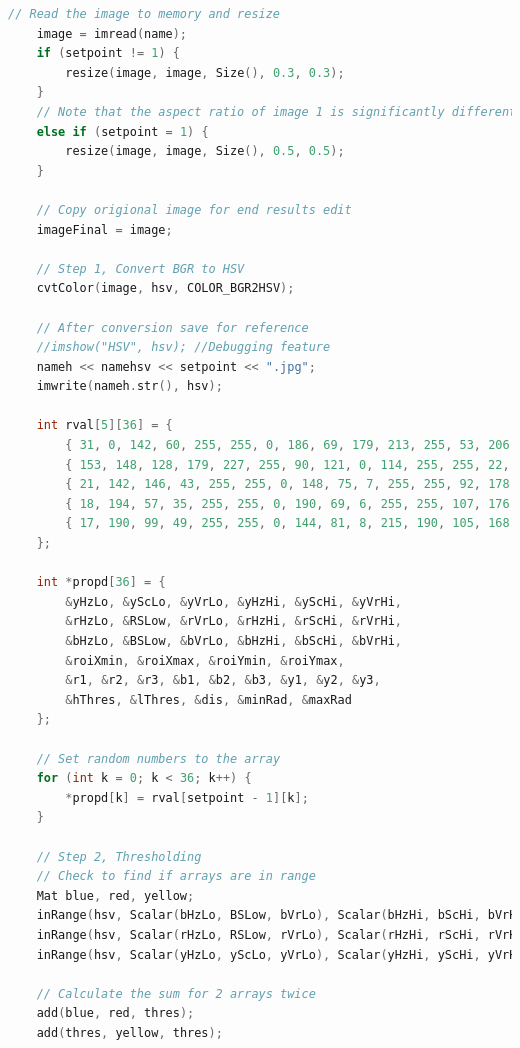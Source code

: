 \documentclass[a4paper, 10pt]{IEEEconf}
\begin{document}
\begin{lstlisting}[language = c++]
	// Read the image to memory and resize
	image = imread(name);
	if (setpoint != 1) {
		resize(image, image, Size(), 0.3, 0.3);
	}
	// Note that the aspect ratio of image 1 is significantly different than the others, these values provide better results
	else if (setpoint = 1) {
		resize(image, image, Size(), 0.5, 0.5);
	}

	// Copy origional image for end results edit
	imageFinal = image;

	// Step 1, Convert BGR to HSV
	cvtColor(image, hsv, COLOR_BGR2HSV);

	// After conversion save for reference
	//imshow("HSV", hsv); //Debugging feature
	nameh << namehsv << setpoint << ".jpg";
	imwrite(nameh.str(), hsv);

	int rval[5][36] = {
		{ 31, 0, 142, 60, 255, 255, 0, 186, 69, 179, 213, 255, 53, 206, 51, 179, 255, 255, 300, 700, 50, 470, 100, 100, 100, 90, 50, 30, 100, 100, 100, 150, 50, 30, 10, 40 },
		{ 153, 148, 128, 179, 227, 255, 90, 121, 0, 114, 255, 255, 22, 63, 148, 89, 198, 255, 260, 700, 170, 470, 110, 100, 100, 100, 130, 50, 140, 180, 110, 150, 50, 30, 10, 40 },
		{ 21, 142, 146, 43, 255, 255, 0, 148, 75, 7, 255, 255, 92, 178, 8, 150, 255, 225, 260, 700, 50, 470, 50, 40, 70, 20, 30,20, 10, 160, 160, 126, 42, 30, 5, 40 },
		{ 18, 194, 57, 35, 255, 255, 0, 190, 69, 6, 255, 255, 107, 176, 45, 112, 255, 255, 260, 700, 50, 470, 60, 65, 67, 34, 85, 88, 100, 100, 100, 82, 34, 30, 10, 40 },
		{ 17, 190, 99, 49, 255, 255, 0, 144, 81, 8, 215, 190, 105, 168, 24, 157, 255, 204, 260, 600, 170, 470, 100, 100, 100, 66, 70, 61, 100, 100, 100, 100, 33, 30, 10, 40 }
	};

	int *propd[36] = {
		&yHzLo, &yScLo, &yVrLo, &yHzHi, &yScHi, &yVrHi,
		&rHzLo, &RSLow, &rVrLo, &rHzHi, &rScHi, &rVrHi,
		&bHzLo, &BSLow, &bVrLo, &bHzHi, &bScHi, &bVrHi,
		&roiXmin, &roiXmax, &roiYmin, &roiYmax,
		&r1, &r2, &r3, &b1, &b2, &b3, &y1, &y2, &y3,
		&hThres, &lThres, &dis, &minRad, &maxRad
	};

	// Set random numbers to the array
	for (int k = 0; k < 36; k++) {
		*propd[k] = rval[setpoint - 1][k];
	}

	// Step 2, Thresholding 
	// Check to find if arrays are in range
	Mat blue, red, yellow;
	inRange(hsv, Scalar(bHzLo, BSLow, bVrLo), Scalar(bHzHi, bScHi, bVrHi), blue);
	inRange(hsv, Scalar(rHzLo, RSLow, rVrLo), Scalar(rHzHi, rScHi, rVrHi), red);
	inRange(hsv, Scalar(yHzLo, yScLo, yVrLo), Scalar(yHzHi, yScHi, yVrHi), yellow);
	
	// Calculate the sum for 2 arrays twice 
	add(blue, red, thres);
	add(thres, yellow, thres);


\end{lstlisting}
\end{document}
